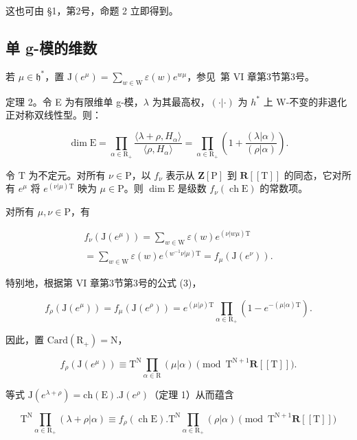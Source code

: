 这也可由 §1，第2号，命题 2 立即得到。

\subsection{单 g-模的维数}

若 \(\mu \in \mathfrak{h}^*\)，置 \(\mathrm{J}(e^{\mu}) = \sum_{w\in \mathrm{W}}\varepsilon (w)e^{w\mu}\)，参见~第 VI 章第3节第3号。

定理 2。令 E 为有限维单 g-模，\(\lambda\) 为其最高权，\((\cdot|\cdot)\) 为 \(h^{*}\) 上 W-不变的非退化正对称双线性型。则：

\[
\dim \mathrm{E} = \prod_ {\alpha \in \mathrm{R} _ {+}} \frac {\langle \lambda + \rho , H _ {\alpha} \rangle}{\langle \rho , H _ {\alpha} \rangle} = \prod_ {\alpha \in \mathrm{R} _ {+}} \left(1 + \frac {(\lambda | \alpha)}{(\rho | \alpha)}\right).
\]

令 \(\mathrm{T}\) 为不定元。对所有 \(\nu \in \mathrm{P}\)，以 \(f_{\nu}\) 表示从 \(\mathbf{Z}[\mathrm{P}]\) 到 \(\mathbf{R}[[\mathrm{T}]]\) 的同态，它对所有 \(e^{\mu}\) 将 \(e^{(\nu |\mu)\mathrm{T}}\) 映为 \(\mu \in \mathrm{P}\)。则 \(\dim \mathrm{E}\) 是级数 \(f_{\nu}(\operatorname{ch}\mathrm{E})\) 的常数项。

对所有 \(\mu, \nu \in \mathrm{P}\)，有

\[
\begin{array}{c} f _ {\nu} (\mathrm{J} (e ^ {\mu})) = \sum_ {w \in \mathrm{W}} \varepsilon (w) e ^ {(\nu | w \mu) \mathrm{T}} \\ = \sum_ {w \in \mathrm{W}} \varepsilon (w) e ^ {(w ^ {- 1} \nu | \mu) \mathrm{T}} = f _ {\mu} (\mathrm{J} (e ^ {\nu})). \end{array}
\]

特别地，根据第 VI 章第3节第3号的公式 (3)，

\[
f _ {\rho} (\mathrm{J} (e ^ {\mu})) = f _ {\mu} (\mathrm{J} (e ^ {\rho})) = e ^ {(\mu | \rho) \mathrm{T}} \prod_ {\alpha \in \mathrm{R} _ {+}} (1 - e ^ {- (\mu | \alpha) \mathrm{T}}).
\]

因此，置 \(\mathrm{Card}(\mathrm{R}_{+})=\mathrm{N}\)，

\[
f _ {\rho} (\mathrm{J} (e ^ {\mu})) \equiv \mathrm{T} ^ {\mathrm{N}} \prod_ {\alpha \in \mathrm{R}} (\mu | \alpha) \pmod {\mathrm{T} ^ {\mathrm{N} + 1} \mathbf {R} [ [ \mathrm{T} ] ]}.
\]

等式 \(\mathrm{J}(e^{\lambda +\rho}) = \mathrm{ch}(\mathrm{E}).\mathrm{J}(e^{\rho})\)（定理 1）从而蕴含

\[
\mathrm{T} ^ {\mathrm{N}} \prod_ {\alpha \in \mathrm{R} _ {+}} (\lambda + \rho | \alpha) \equiv f _ {\rho} (\operatorname{ch} \mathrm{E}). \mathrm{T} ^ {\mathrm{N}} \prod_ {\alpha \in \mathrm{R} _ {+}} (\rho | \alpha) \pmod {\mathrm{T} ^ {\mathrm{N} + 1} \mathbf {R} [ [ \mathrm{T} ] ]}
\]

